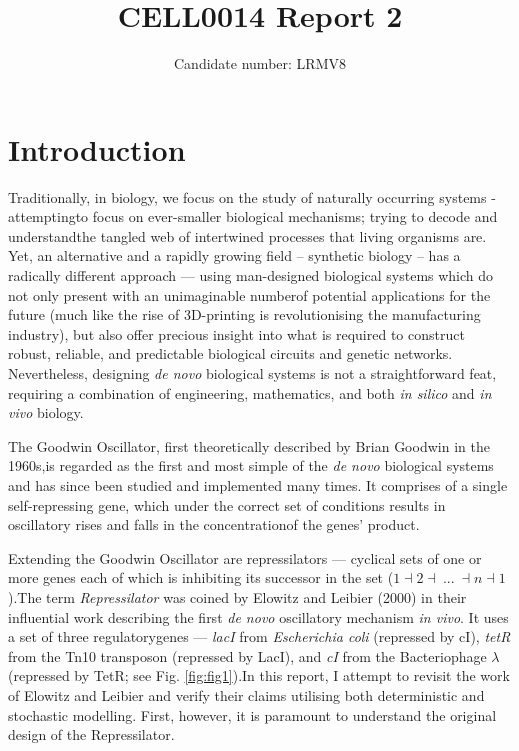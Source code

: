 \documentclass[runningheads,a4paper]{llncs}
\title{\textbf{CELL0014 Report 2}}
\author{\large{Candidate number: LRMV8}} %
\institute{\large{University College London}}
\begin{document}
%
\maketitle%

\bigskip
\bigskip
\onehalfspacing
%
\section*{Introduction}
Traditionally, in biology, we focus on the study of naturally occurring systems - attempting\linebreak to focus on ever-smaller biological mechanisms; trying to decode and understand\linebreak the tangled web of intertwined processes that living organisms are. Yet, an alternative and a rapidly growing field -- synthetic biology -- has a radically different approach --- using man-designed biological systems which do not only present with an unimaginable number\linebreak of potential applications for the future (much like the rise of 3D-printing is revolutionising the manufacturing industry), but also offer precious insight into what is required to construct robust, reliable, and predictable biological circuits and genetic networks. Nevertheless, designing \textit{de novo} biological systems is not a straightforward feat, requiring a combination of engineering, mathematics, and both \textit{in silico} and \textit{in vivo} biology.

The Goodwin Oscillator, first theoretically described by Brian Goodwin in the 1960s,\linebreak is regarded as the first and most simple of the \textit{de novo} biological systems and has since been studied and implemented many times\cite{Gonze2013a, Purcell2010a}. It comprises of a single self-repressing gene, which under the correct set of conditions results in oscillatory rises and falls in the concentration\linebreak of the genes' product. 

Extending the Goodwin Oscillator are repressilators --- cyclical sets of one or more genes each of which is inhibiting its successor in the set ($1 \dashv 2 \dashv\ ...\ \dashv n \dashv 1$)\cite{Muller2006, Purcell2010a}.\linebreak The term \textit{Repressilator} was coined by Elowitz and Leibier (2000)\cite{Elowitz2000d} in their influential work describing the first \textit{de novo} oscillatory mechanism \textit{in vivo}. It uses a set of three regulatory\linebreak genes --- \textit{lacI} from \textit{Escherichia coli} (repressed by cI), \textit{tetR} from the Tn10 transposon (repressed by LacI), and \textit{cI} from the Bacteriophage $\lambda$ (repressed by TetR; see Fig. \ref{fig:fig1})\cite{Elowitz2000d}.\linebreak In this report, I attempt to revisit the work of Elowitz and Leibier and verify their claims utilising both deterministic and stochastic modelling. First, however, it is paramount to understand the original design of the Repressilator.
\end{document}
